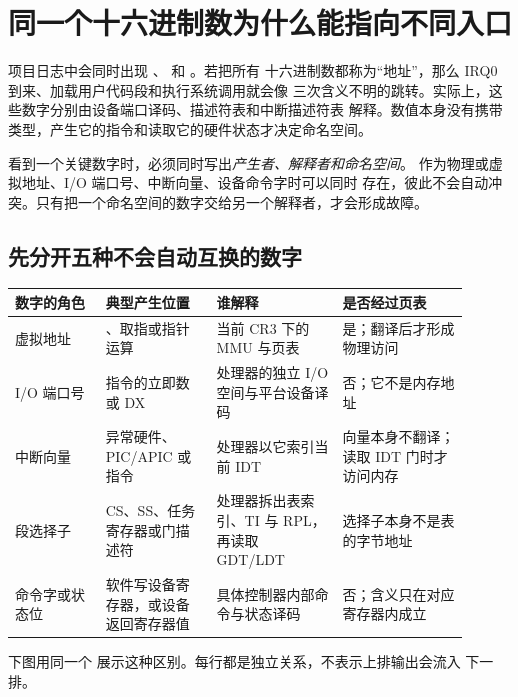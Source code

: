 \section{同一个十六进制数为什么能指向不同入口}

项目日志中会同时出现 、 和 。若把所有
十六进制数都称为“地址”，那么 IRQ0 到来、加载用户代码段和执行系统调用就会像
三次含义不明的跳转。实际上，这些数字分别由设备端口译码、描述符表和中断描述符表
解释。数值本身没有携带类型，产生它的指令和读取它的硬件状态才决定命名空间。

\begin{keyidea}
看到一个关键数字时，必须同时写出\emph{产生者、解释者和命名空间}。
 作为物理或虚拟地址、I/O 端口号、中断向量、设备命令字时可以同时
存在，彼此不会自动冲突。只有把一个命名空间的数字交给另一个解释者，才会形成故障。
\end{keyidea}

\subsection{先分开五种不会自动互换的数字}

\begin{longtable}{|L{0.18\linewidth}|L{0.22\linewidth}|L{0.25\linewidth}|L{0.25\linewidth}|}
\hline
数字的角色 & 典型产生位置 & 谁解释 & 是否经过页表 \\ \hline
虚拟地址 &
、取指或指针运算 &
当前 CR3 下的 MMU 与页表 &
是；翻译后才形成物理访问 \\\tablerowrule
I/O 端口号 &
 指令的立即数或 DX &
处理器的独立 I/O 空间与平台设备译码 &
否；它不是内存地址 \\\tablerowrule
中断向量 &
异常硬件、PIC/APIC 或  指令 &
处理器以它索引当前 IDT &
向量本身不翻译；读取 IDT 门时才访问内存 \\\tablerowrule
段选择子 &
CS、SS、任务寄存器或门描述符 &
处理器拆出表索引、TI 与 RPL，再读取 GDT/LDT &
选择子本身不是表的字节地址 \\\tablerowrule
命令字或状态位 &
软件写设备寄存器，或设备返回寄存器值 &
具体控制器内部命令与状态译码 &
否；含义只在对应寄存器内成立 \\ \hline
\end{longtable}

下图用同一个  展示这种区别。每行都是独立关系，不表示上排输出会流入
下一排。

